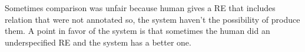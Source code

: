 
Sometimes comparison was unfair because human gives a RE that includes relation that were not annotated so, the system haven't the possibility of produce them. A point in favor of the system is that sometimes the human did an underspecified RE and the system has a better one.\\

